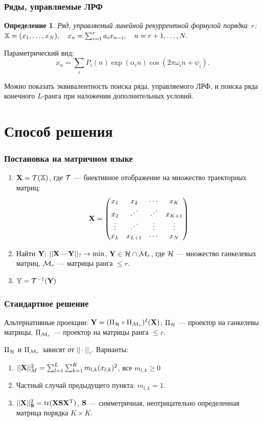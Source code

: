 \documentclass[unicode, notheorems]{beamer}
\newtheorem{definition}{Определение}
\begin{document}
\begin{frame}
    \frametitle{Ряды, управляемые ЛРФ}
    \begin{definition}
    Ряд, управляемый линейной рекуррентной формулой порядка~$r$: $\mathbb{X} = (x_1, \ldots, x_N), \quad x_n = \sum_{i = 1}^{r} a_i x_{n-i}, \quad n = r + 1, \ldots, N.$
    \end{definition}
    Параметрический вид:
    \begin{equation*}
    x_n = \sum_i P_i(n) \exp(\alpha_i n) \cos(2 \pi \omega_i n + \psi_i).
    \end{equation*}
    
    Можно показать эквивалентность поиска ряда, управляемого ЛРФ, и поиска ряда конечного $L$-ранга при наложении дополнительных условий.
\end{frame}


\section{Способ решения}
\begin{frame}
    \frametitle{Постановка на матричном языке}
    \begin{enumerate}
    \item $\mathbf{X} = \mathcal{T}(\mathbb{X})$, где $\mathcal{T}$ --- биективное отображение на множество траекторных матриц:
\begin{equation*}
\mathbf{X} = \begin{pmatrix}
x_1 & x_2 & \cdots & x_K \\ 
x_2 & \iddots & \iddots & x_{K+1} \\ 
\vdots & \iddots & \vdots & \vdots \\ 
x_L & x_{L+1} & \cdots & x_N
\end{pmatrix} 
\end{equation*}
    \item Найти $\mathbf{Y}$: $||\mathbf{X} - \mathbf{Y}||_? \to \min$, $\mathbf{Y} \in \mathcal{H} \cap \mathcal{M}_r$, где $\mathcal{H}$ --- множество ганкелевых матриц, $\mathcal{M}_r$ --- матрицы ранга $\le r$.
    \item $\mathbb{Y} = \mathcal{T}^{-1}(\mathbf{Y})$
    \end{enumerate}
\end{frame}

\begin{frame}
    \frametitle{Стандартное решение}
    Альтернативные проекции: $\mathbf{Y} = (\Pi_{\mathcal{H}} \circ \Pi_{\mathcal{M}_r})^I (\mathbf{X})$, $\Pi_{\mathcal{H}}$ --- проектор на ганкелевы матрицы, $\Pi_{\mathcal{M}_r}$ --- проектор на матрицы ранга $\le r$.
    \vspace{0.3cm}

    $\Pi_{\mathcal{H}}$ и $\Pi_{\mathcal{M}_r}$ зависят от $||\cdot||_?$. Варианты:
    \begin{enumerate}
    \item $||\mathbf{X}||_M^2 = \sum_{l = 1}^L \sum_{k = 1}^K m_{l, k} (x_{l, k})^2$, все $m_{l, k} \ge 0$
    \item Частный случай предыдущего пункта: $m_{l, k} = 1$.
    \item $||\mathbf{X}||_{\mathbf{S}}^2 = \text{tr}(\mathbf{X} \mathbf{S} \mathbf{X}^{\mathrm{T}})$, $\mathbf{S}$ --- симметричная, неотрицательно определенная матрица порядка $K \times K$.
    \end{enumerate}
\end{frame}
\end{document}
